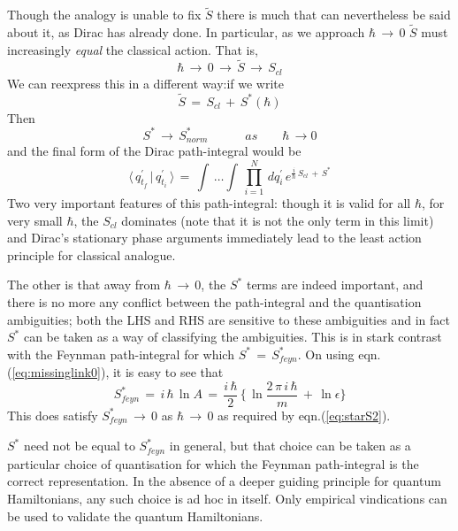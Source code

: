 \documentclass[a4paper]{JHEP3}
\newcommand{\be}{\begin{equation}}
\newcommand{\ee}{\end{equation}}
\begin{document}
Though the analogy is unable to fix ${\tilde S}$ there is much that can nevertheless be said about it, as Dirac has already done. In 
particular, as we approach $\hbar\,\rightarrow\,0$ ${\tilde S}$ must increasingly {\it equal} the classical action.  That is,
\be
\label{eq:tildeS}
\hbar\,\rightarrow\,0\,\rightarrow\,{\tilde S}\,\rightarrow\,S_{cl}
\ee
We can reexpress this in a different way:if we write
\be
\label{eq:starS}
{\tilde S}\,=\,S_{cl}\,+\,S^*(\hbar)
\ee
Then 
\be
\label{eq:starS2}
S^*\,\rightarrow\, S^*_{norm} \quad\quad\quad as\quad\quad \hbar\,\rightarrow 0
\ee
and the final form of the Dirac path-integral would be
\be
\label{eq:diracpathint*}
\langle\,q_{t_f}^\prime\,|\,q_{t_i}^\prime\,\rangle\,=
\,\int\,\ldots\int\,\prod_{i=1}^{N}\,dq_i^\prime\,e^{\frac{i}{\hbar}\,S_{cl}\,+\,S^*}
\ee 
Two very important features of this path-integral: though it is valid for all $\hbar$, for very small $\hbar$, the $S_{cl}$ dominates (note
that it is not the only term in this limit) and Dirac's stationary phase arguments immediately lead to the least action principle for classical
analogue.

The other is that away from $\hbar\,\rightarrow\,0$, the $S^*$ terms are indeed important, and there is no more any conflict between the
path-integral and the quantisation ambiguities; both the LHS and RHS are sensitive to these ambiguities and in fact $S^*$ can be taken as a
way of classifying the ambiguities. This is in stark contrast with the Feynman path-integral for which $S^*\,=\,S^*_{feyn}$. On using
eqn.(\ref{eq:missinglink0}), it is easy to see that
\be
\label{eq:S*feyn} 
S^*_{feyn}\,=\,i\,\hbar\,\ln{A}\,=\,\frac{i\,\hbar}{2}\,\{\,\ln{\frac{2\,\pi\,i\,\hbar}{m}}\,+\,\ln{\epsilon}\}
\ee
This does satisfy $S^*_{feyn}\,\rightarrow\,0$ as $\hbar\,\rightarrow\,0$ as required by eqn.(\ref{eq:starS2}).

$S^*$ need not be equal to $S^*_{feyn}$ in general, but that choice can be taken as a particular choice of quantisation for which the 
Feynman path-integral is the
correct representation. In the absence of a deeper guiding principle for quantum Hamiltonians, any such choice is ad hoc in itself.
Only empirical vindications can be used to validate the quantum Hamiltonians.
\end{document}
